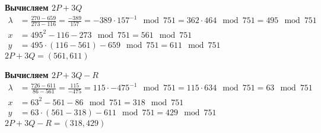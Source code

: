 \textbf{Вычисляем $2P+3Q$}
\begin{equation*}
	\begin{aligned}
		\lambda &= \frac{270-659}{273-116} = \frac{-389}{157} = -389 \cdot 157^{-1}\mod{751} = 362 \cdot 464\mod{751} = 495\mod{751} \\
		x &= 495^2 - 116 - 273 \mod{751} = 561\mod{751} \\
		y &= 495 \cdot (116 - 561) - 659\mod{751} = 611\mod{751}
	\end{aligned}
\end{equation*}
\textbf{$2P+3Q=(561, 611)$}

\textbf{Вычисляем $2P+3Q-R$}
\begin{equation*}
	\begin{aligned}
		\lambda &= \frac{726-611}{86-561} = \frac{115}{-475} = 115 \cdot -475^{-1}\mod{751} = 115 \cdot 634\mod{751} = 63\mod{751} \\
		x &= 63^2 - 561 - 86 \mod{751} = 318\mod{751} \\
		y &= 63 \cdot (561 - 318) - 611\mod{751} = 429\mod{751}
	\end{aligned}
\end{equation*}
\textbf{$2P+3Q-R=(318, 429)$}
